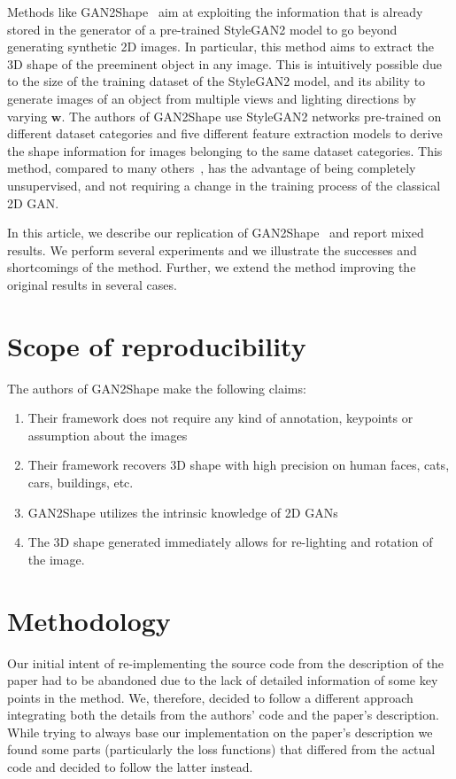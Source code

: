 Methods like GAN2Shape~\cite{gan2shape} aim at exploiting the information that is already stored in the generator of a pre-trained StyleGAN2 model to go beyond generating synthetic 2D images. In particular, this method aims to extract the 3D shape of the preeminent object in any image. This is intuitively possible due to the size of the training dataset of the StyleGAN2 model, and its ability to generate images of an object from multiple views and lighting directions by varying $\textbf{w}$. The authors of GAN2Shape use StyleGAN2 networks pre-trained on different dataset categories and five different feature extraction models to derive the shape information for images belonging to the same dataset categories. This method, compared to many others~\cite{lunz2020inverse, henzler2019escaping, wu20153d, wang2019deep}, has the advantage of being completely unsupervised, and not requiring a change in the training process of the classical 2D GAN. 

In this article, we describe our replication of GAN2Shape~\cite{gan2shape} and report mixed results. 
We perform several experiments and we illustrate the successes and shortcomings of the method. Further, we extend the method improving the original results in several cases.

\section{Scope of reproducibility}
\label{sec:claims}
The authors of GAN2Shape make the following claims:
\begin{enumerate}
    \item Their framework does not require any kind of annotation, keypoints or assumption about the images
    \item Their framework recovers 3D shape with high precision on human faces, cats, cars, buildings, etc.
    \item GAN2Shape utilizes the intrinsic knowledge of 2D GANs
    \item The 3D shape generated immediately allows for re-lighting and rotation of the image.
\end{enumerate}

\section{Methodology}
\label{sec:methodology}
Our initial intent of re-implementing the source code from the description of the paper had to be abandoned due to the lack of detailed information of some key points in the method. We, therefore, decided to follow a different approach integrating both the details from the authors' code and the paper's description. While trying to always base our implementation on the paper's description we found some parts (particularly the loss functions) that differed from the actual code and decided to follow the latter instead.

